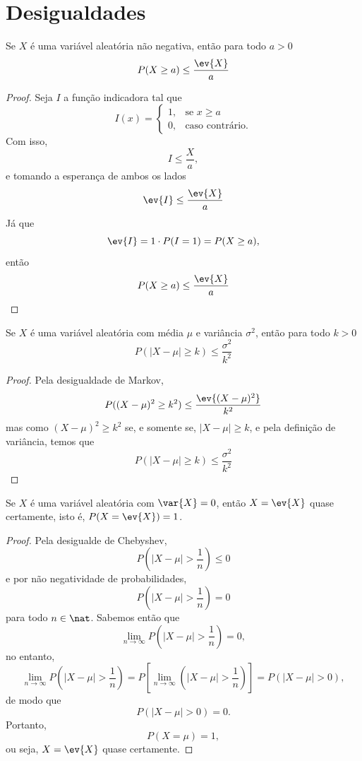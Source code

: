 \section{Desigualdades}

\begin{thm:desigualdade de markov}
Se $X$ é uma variável aleatória não negativa, então para todo $a > 0$
\[
    P(X \ge a) \le \frac{\ev{X}}{a}
\]
\end{thm:desigualdade de markov}
\begin{proof}
Seja $I$ a função indicadora tal que
\[
    I(x) = \begin{cases}
        1,&\text{se } x \ge a \\
        0,&\text{caso contrário.}
    \end{cases}
\]
Com isso,
\[
    I \le \frac{X}{a},
\]
e tomando a esperança de ambos os lados
\[
    \ev{I} \le \frac{\ev{X}}{a}
\]
Já que
\[
    \ev{I} = 1 \cdot P(I = 1) = P(X \ge a),
\]
então
\[
    P(X \ge a) \le \frac{\ev{X}}{a}
\]
\end{proof}

\begin{cor:desigualdade de chebyshev}
\label{cor:desigualdade de chebyshev}
Se $X$ é uma variável aleatória com média $\mu$ e variância $\sigma^2$, então
para todo $k > 0$
\[
    P(|X - \mu| \ge k) \le \frac{\sigma^2}{k^2}
\]
\end{cor:desigualdade de chebyshev}
\begin{proof}
Pela desigualdade de Markov,
\[
    P((X - \mu)^2 \ge k^2) \le \frac{\ev{(X - \mu)^2}}{k^2}
\]
mas como $(X - \mu)^2 \ge k^2$ se, e somente se, $|X - \mu| \ge k$, e pela definição
de variância, temos que
\[
    P(|X - \mu| \ge k) \le \frac{\sigma^2}{k^2}
\]
\end{proof}

\begin{prop:variancia 0 e igual media}
Se $X$ é uma variável aleatória com $\var{X} = 0$, então $X = \ev{X}$ quase certamente, isto é, $P(X = \ev{X}) = 1$.
\end{prop:variancia 0 e igual media}
\begin{proof}
Pela desigualde de Chebyshev,
\[
    P\left(|X - \mu| > \frac{1}{n}\right) \le 0
\]
e por não negatividade de probabilidades,
\[
    P\left(|X - \mu| > \frac{1}{n}\right) = 0
\]
para todo $n \in \nat$.
Sabemos então que
\[
    \lim_{n \to \infty} P\left(|X - \mu| > \frac{1}{n}\right) = 0,
\]
no entanto,
\[
    \lim_{n \to \infty} P\left(|X - \mu| > \frac{1}{n}\right) =
    P\left[\lim_{n \to \infty} \left(|X - \mu| > \frac{1}{n}\right)\right] =
    P(|X - \mu| > 0),
\]
de modo que
\[
    P(|X - \mu| > 0) = 0.
\]
Portanto,
\[
    P(X = \mu) = 1,
\]
ou seja, $X = \ev{X}$ quase certamente.
\end{proof}

